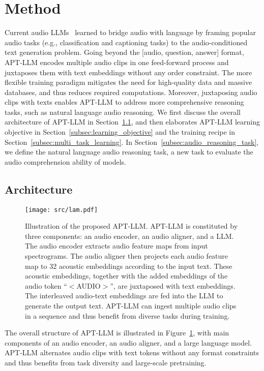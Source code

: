 \section{Method} \label{sec:APT LLMs}
Current audio LLMs~\citep{gong_listen_2023,deshmukh_pengi_2023} learned to bridge audio with language by framing popular audio tasks (e.g., classification and captioning tasks) to the audio-conditioned text generation problem. Going beyond the [audio, question, answer] format, APT-LLM encodes multiple audio clips in one feed-forward process and juxtaposes them with text embeddings without any order constraint. The more flexible training paradigm mitigates the need for high-quality data and massive databases, and thus reduces required computations. Moreover, juxtaposing audio clips with texts enables APT-LLM to address more comprehensive reasoning tasks, such as natural language audio reasoning. We first discuss the overall architecture of APT-LLM in Section~\ref{subsec:architecture}, and then elaborates APT-LLM learning objective in Section~\ref{subsec:learning_objective} and the training recipe in Section~\ref{subsec:multi_task_learning}. In Section~\ref{subsec:audio_reasoning_task}, we define the natural language audio reasoning task, a new task to evaluate the audio comprehension ability of models.
 
\subsection{Architecture} \label{subsec:architecture}
\begin{figure}[t]
    \centering
    \texttt{[image: src/lam.pdf]}
    \caption{Illustration of the proposed APT-LLM. APT-LLM is constituted by three components: an audio encoder, an audio aligner, and a LLM. The audio encoder extracts audio feature maps from input spectrograms. The audio aligner then projects each audio feature map to 32 acoustic embeddings according to the input text. These acoustic embeddings, together with the added embeddings of the audio token ``$<$AUDIO$>$'', are juxtaposed with text embeddings. The interleaved audio-text embeddings are fed into the LLM to generate the output text. APT-LLM can ingest multiple audio clips in a sequence and thus benefit from diverse tasks during training.}
    \label{fig.:lam}
    \vspace{-0.3cm}
\end{figure}

The overall structure of APT-LLM is illustrated in Figure~\ref{fig.:lam}, with main components of an audio encoder, an audio aligner, and a large language model. APT-LLM alternates audio clips with text tokens without any format constraints and thus benefits from task diversity and large-scale pretraining.


